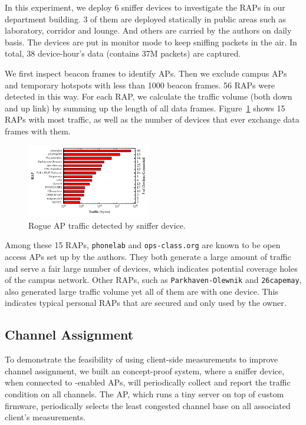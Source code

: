 In this experiment, we deploy 6 sniffer devices to investigate the RAPs in our
department building.  3 of them are deployed statically in public areas such as
laboratory, corridor and lounge. And others are carried by the authors on daily
basis. The devices are put in monitor mode to keep sniffing packets in the air.
In total, 38 device-hour's data (contains 37M packets) are captured.  

We first inspect beacon frames to identify APs. Then we exclude campus APs and
temporary hotspots with less than 1000 beacon frames. 56 RAPs were
detected in this way. For each RAP, we calculate the traffic volume (both
down and up link) by summing up the length of all data frames.
Figure~\ref{fig:rap} shows 15 RAPs with most traffic, as well as the number of
devices that ever exchange data frames with them.

\begin{figure}[t!]
  \centering
  \includegraphics[width=0.48\textwidth]{./figures/RAPTrafficGraph.pdf}
  \caption{Rogue AP traffic detected by sniffer device.}
  \label{fig:rap}
\end{figure}

Among these 15 RAPs, \texttt{phonelab} and \texttt{ops-class.org} are known to
be open access APs set up by the authors.  They both generate a large amount of
traffic and serve a fair large number of devices, which indicates potential
coverage holes of the campus network. Other RAPs, such as
\texttt{Parkhaven-Olewnik} and \texttt{26capemay}, also generated large traffic
volume yet all of them are with one device. This indicates typical personal RAPs
that are secured and only used by the owner.


\subsection{Channel Assignment}

To demonstrate the feasibility of using client-side measurements to improve
channel assignment, we built an concept-proof system, where a sniffer device,
when connected to \PS{}-enabled APs, will periodically collect
and report the traffic condition on all channels. The AP, which runs a tiny 
server on top of custom firmware, periodically selects the least congested
channel base on all associated client's measurements.

